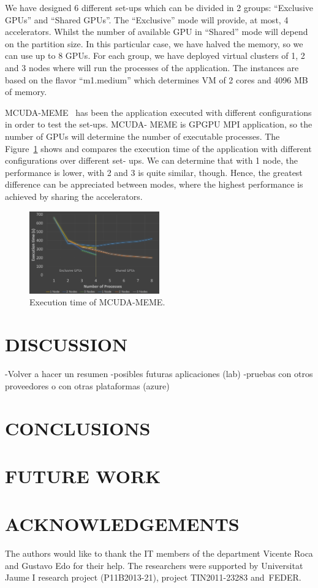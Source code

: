 \documentclass[a4paper,twoside]{article}
\begin{document}
We have designed 6 different set-ups which can be divided
in 2 groups: “Exclusive GPUs” and “Shared GPUs”. The
“Exclusive” mode will provide, at most, 4 accelerators. Whilst
the number of available GPU in “Shared” mode will depend
on the partition size. In this particular case, we have halved
the memory, so we can use up to 8 GPUs. For each group, we
have deployed virtual clusters of 1, 2 and 3 nodes where will
run the processes of the application. The instances are based
on the flavor “m1.medium” which determines VM of 2 cores
and 4096 MB of memory.

MCUDA-MEME~\cite{Liu2010} has been the application executed with
different configurations in order to test the set-ups. MCUDA-
MEME is GPGPU MPI application, so the number of GPUs
will determine the number of executable processes.
The Figure~\ref{fig3} shows and compares the execution time of
the application with different configurations over different set-
ups. We can determine that with 1 node, the performance is
lower, with 2 and 3 is quite similar, though. Hence, the greatest
difference can be appreciated between modes, where the
highest performance is achieved by sharing the accelerators.

\begin{figure}[htb]
  \centering
  \includegraphics[width=0.5\textwidth]{images/chart.jpg}
  \caption{Execution time of MCUDA-MEME.}
  \label{fig3}
\end{figure}

\section{\uppercase{Discussion}}
\label{sec:discussion}
-Volver a hacer un resumen
-posibles futuras aplicaciones (lab)
-pruebas con otros proveedores o con otras plataformas (azure)

\section{\uppercase{Conclusions}}
\label{sec:conclusions}


\section{\uppercase{Future work}}
\label{sec:future}


\section*{\uppercase{Acknowledgements}}
The authors would like to thank the IT members of the department Vicente Roca and Gustavo Edo for their help.
The researchers were supported by Universitat Jaume I research project (P11B2013-21), project
TIN2011-23283 and~FEDER.


{\small
}
\end{document}
